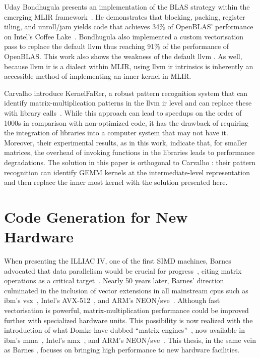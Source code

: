 \documentclass[\main/thesis.tex]{subfiles}
\begin{document}
Uday Bondhugula presents an implementation of the BLAS strategy within the emerging MLIR framework~\autocite{bondhugula2020high}.
He demonstrates that blocking, packing, register tiling, and unroll/jam yields code that achieves 34\% of OpenBLAS' performance on Intel's Coffee Lake~\autocite{bondhugula2020high}.
Bondhugula also implemented a custom \gls{vectorisation} pass to replace the default \gls{llvm}  thus reaching 91\% of the performance of OpenBLAS.
This work also shows the weakness of the default \gls{llvm} .
As well, because \gls{llvm} \gls{ir} is a dialect within MLIR, using \gls{llvm} \gls{ir} \glspl{intrinsic} is inherently an accessible method of implementing an inner kernel in MLIR.

Carvalho \etal introduce KernelFaRer, a robust pattern recognition system that can identify matrix-multiplication patterns in the \gls{llvm} \gls{ir} level and can replace these with library calls~\autocite{carvalho2021kernelfarer}.
While this approach can lead to speedups on the order of 1000s in comparison with non-optimized code, it has the drawback of requiring the integration of libraries into a computer system that may not have it.
Moreover, their experimental results, as in this work, indicate that, for smaller matrices, the overhead of invoking functions in the libraries leads to performance degradations.
The solution in this paper is orthogonal to Carvalho \etal: their pattern recognition can identify GEMM kernels at the intermediate-level representation and then replace the inner most kernel with the solution presented here.

\section{Code Generation for New Hardware}
When presenting the ILLIAC IV, one of the first SIMD machines, Barnes \etal advocated that data parallelism would be crucial for progress~\autocite{barnes1968illiac}, citing matrix operations as a critical target~\autocite{kuck1968illiac}.
Nearly 50 years later, Barnes' direction culminated in the inclusion of vector extensions in all mainstream \glspl{cpu} such as \gls{ibm}'s \gls{vsx}~\autocite{PowerISA}, Intel's AVX-512~\autocite{IntelISA}, and ARM's NEON/\gls{sve}~\autocite{ArmISA}.
Although fast \gls{vectorisation} is powerful, matrix-multiplication performance could be improved further with specialized hardware units.
This possibility is now realized with the introduction of what Domke \etal have dubbed ``matrix engines''~\autocite{domke2020matrix}, now available in \gls{ibm}'s \gls{mma}~\autocite{PowerISA}, Intel's \gls{amx}~\autocite{IntelISA}, and ARM's NEON/\gls{sve}~\autocite{ArmISA}.
This thesis, in the same vein as Barnes \etal, focuses on bringing high performance to new hardware facilities.
\end{document}
